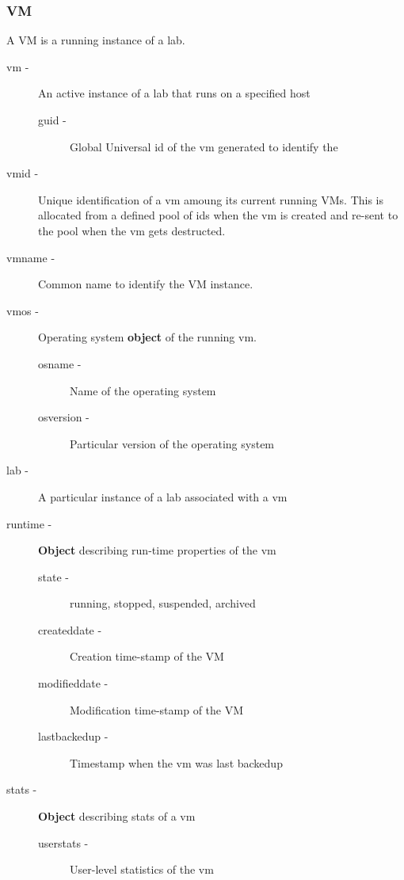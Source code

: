 \documentclass[11pt]{article}
\begin{document}
\subsubsection{VM}
\label{sec-3.3.6}


    A VM is a running instance of a lab.

\begin{description}
\item [vm -] An active instance of a lab that runs on a specified host

\begin{description}
\item [guid -] Global Universal id of the vm generated to identify the
\end{description}

\item [vmid -] Unique identification of a vm amoung its current running
      VMs. This is allocated from a defined pool of ids when the vm is
      created and re-sent to the pool when the vm gets destructed.
\item [vmname -] Common name to identify the VM instance.
\item [vmos -] Operating system \textbf{object} of the running vm.

\begin{description}
\item [osname -] Name of the operating system
\item [osversion -] Particular version of the operating system
\end{description}

\item [lab -] A particular instance of a lab associated with a vm
\item [runtime -] \textbf{Object} describing run-time properties of the vm

\begin{description}
\item [state -]  running, stopped, suspended, archived
\item [createddate -] Creation time-stamp of the VM
\item [modifieddate -] Modification time-stamp of the VM
\item [lastbackedup -] Timestamp when the vm was last backedup
\end{description}

\item [stats -] \textbf{Object} describing stats of a vm

\begin{description}
\item [userstats -] User-level statistics of the vm


\end{description}
\end{description}
\end{document}
